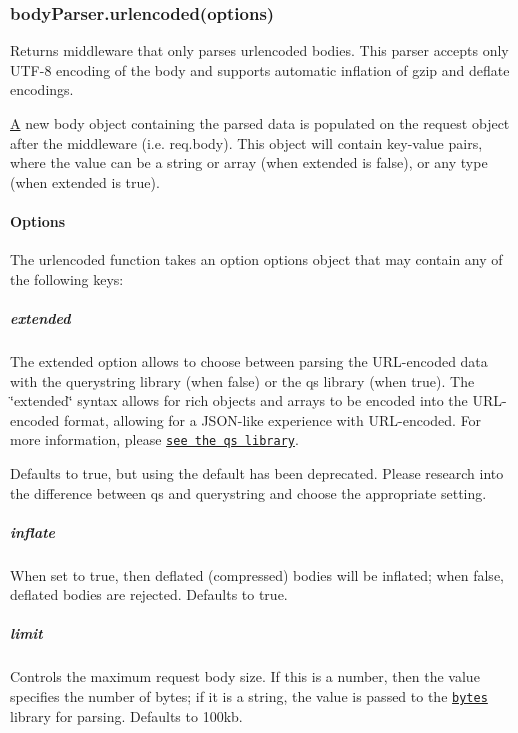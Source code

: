 \subsubsection*{body\+Parser.\+urlencoded(options)}

Returns middleware that only parses {\ttfamily urlencoded} bodies. This parser accepts only U\+T\+F-\/8 encoding of the body and supports automatic inflation of {\ttfamily gzip} and {\ttfamily deflate} encodings.

\hyperlink{class_a}{A} new {\ttfamily body} object containing the parsed data is populated on the {\ttfamily request} object after the middleware (i.\+e. {\ttfamily req.\+body}). This object will contain key-\/value pairs, where the value can be a string or array (when {\ttfamily extended} is {\ttfamily false}), or any type (when {\ttfamily extended} is {\ttfamily true}).

\paragraph*{Options}

The {\ttfamily urlencoded} function takes an option {\ttfamily options} object that may contain any of the following keys\+:

\subparagraph*{extended}

The {\ttfamily extended} option allows to choose between parsing the U\+R\+L-\/encoded data with the {\ttfamily querystring} library (when {\ttfamily false}) or the {\ttfamily qs} library (when {\ttfamily true}). The \char`\"{}extended\char`\"{} syntax allows for rich objects and arrays to be encoded into the U\+R\+L-\/encoded format, allowing for a J\+S\+O\+N-\/like experience with U\+R\+L-\/encoded. For more information, please \href{https://www.npmjs.org/package/qs#readme}{\tt see the qs library}.

Defaults to {\ttfamily true}, but using the default has been deprecated. Please research into the difference between {\ttfamily qs} and {\ttfamily querystring} and choose the appropriate setting.

\subparagraph*{inflate}

When set to {\ttfamily true}, then deflated (compressed) bodies will be inflated; when {\ttfamily false}, deflated bodies are rejected. Defaults to {\ttfamily true}.

\subparagraph*{limit}

Controls the maximum request body size. If this is a number, then the value specifies the number of bytes; if it is a string, the value is passed to the \href{https://www.npmjs.com/package/bytes}{\tt bytes} library for parsing. Defaults to {\ttfamily \textquotesingle{}100kb\textquotesingle{}}.

